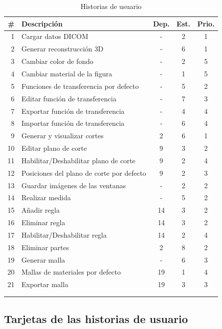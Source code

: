 \begin{longtable} {r l c c c}
	\hline
	\#	&	Descripción									&	Dep.	&	Est.	&	Prio.	\\
	\hline \hline
	\endhead
	1	&	Cargar datos DICOM							&	-		&	2		&	1	\\
	\hline
	2	&	Generar reconstrucción 3D					&	-		&	6		&	1	\\
	\hline
	3	&	Cambiar color de fondo						&	-		&	2		&	5	\\
	\hline
	4	&	Cambiar material de la figura				&	-		&	1		&	5	\\
	\hline
	5	&	Funciones de transferencia por defecto		&	-		&	5		&	2	\\
	\hline
	6	&	Editar función de transferencia				&	-		&	7		&	3	\\
	\hline
	7	&	Exportar función de transferencia			&	-		&	4		&	4	\\
	\hline
	8	&	Importar función de transferencia			&	-		&	6		&	4	\\
	\hline
	9	&	Generar y visualizar cortes					&	2		&	6		&	1	\\
	\hline
	10	&	Editar plano de corte						&	9		&	3		&	2	\\
	\hline
	11	&	Habilitar/Deshabilitar plano de corte		&	9		&	2		&	4	\\
	\hline
	12	&	Posiciones del plano de corte por defecto	&	9		&	2		&	3	\\
	\hline
	13	&	Guardar imágenes de las ventanas			&	-		&	2		&	2	\\
	\hline
	14	&	Realizar medida								&	-		&	5		&	2	\\
	\hline
	15	&	Añadir regla								&	14		&	3		&	2	\\
	\hline
	16	&	Eliminar regla								&	14		&	3		&	2	\\
	\hline
	17	&	Habilitar/Deshabilitar regla				&	14		&	2		&	4	\\
	\hline
	18	&	Eliminar partes								&	2		&	8		&	2	\\
	\hline
	19	&	Generar malla								&	-		&	6		&	3	\\
	\hline
	20	&	Mallas de materiales por defecto			&	19		&	1		&	4	\\
	\hline
	21	&	Exportar malla								&	19		&	3		&	3	\\
	\hline
	\\
	\caption{Historias de usuario}
	\label{tab:hus}
\end{longtable}

\subsection{Tarjetas de las historias de usuario}

